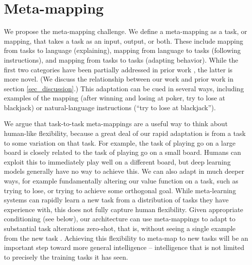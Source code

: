 \documentclass{article}
\begin{document}
\section{Meta-mapping}
We propose the meta-mapping challenge. We define a meta-mapping as a task, or mapping, that takes a task as an input, output, or both. These include mapping from tasks to language (explaining), mapping from language to tasks (following instructions), and mapping from tasks to tasks (adapting behavior). While the first two categories have been partially addressed in prior work \citep[e.g.][]{Hermann2017, Co-Reyes2019}, the latter is more novel. (We discuss the relationship between our work and prior work in section \ref{sec_discussion}.) This adaptation can be cued in several ways, including examples of the mapping (after winning and losing at poker, try to lose at blackjack) or natural-language instructions (``try to lose at blackjack''). \par
We argue that task-to-task meta-mappings are a useful way to think about human-like flexibility, because a great deal of our rapid adaptation is from a task to some variation on that task. For example, the task of playing go on a large board is closely related to the task of playing go on a small board. Humans can exploit this to immediately play well on a different board, but deep learning models generally have no way to achieve this. We can also adapt in much deeper ways, for example fundamentally altering our value function on a task, such as trying to lose, or trying to achieve some orthogonal goal. While meta-learning systems can rapidly learn a new task from a distribution of tasks they have experience with, this does not fully capture human flexibility. Given appropriate conditioning (see below), our architecture can use meta-mappings to adapt to substantial task alterations zero-shot, that is, without seeing a single example from the new task \citep{Lake2016}. Achieving this flexibility to meta-map to new tasks will be an important step toward more general intelligence -- intelligence that is not limited to precisely the training tasks it has seen. \par 

\end{document}
